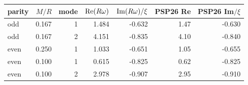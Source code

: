 \begin{tabular}{lrrrrrr}\toprule
parity & $M/R$ & mode & ${\rm Re}(R\omega)$ & ${\rm Im}(R\omega)/\xi$ & PSP26 Re & PSP26 Im$/\xi$\\\midrule
odd & 0.167 & 1 & 1.484 & -0.632 & 1.47 & -0.630 \\
odd & 0.167 & 2 & 4.151 & -0.835 & 4.10 & -0.840 \\
even & 0.250 & 1 & 1.033 & -0.651 & 1.05 & -0.655 \\
even & 0.100 & 1 & 0.615 & -0.825 & 0.62 & -0.825 \\
even & 0.100 & 2 & 2.978 & -0.907 & 2.95 & -0.910 \\
\bottomrule\end{tabular}
